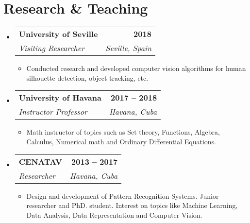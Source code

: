 \documentclass[letterpaper,11pt]{article}
\makeatletter
\newcommand{\resumeItem}[1]{
  \item\small{
    {#1 \vspace{-2pt}}
  }
}
\newcommand{\resumeSubheading}[4]{
  \vspace{-2pt}\item
    \begin{tabular*}{1.0\textwidth}[t]{l@{\extracolsep{\fill}}r}
      \textbf{#1} & \textbf{\small #2} \\
      \textit{\small#3} & \textit{\small #4} \\
    \end{tabular*}\vspace{-7pt}
}
\newcommand{\resumeProjectHeading}[2]{
    \item
    \begin{tabular*}{1.001\textwidth}{l@{\extracolsep{\fill}}r}
      \small#1 & \textbf{\small #2}\\
    \end{tabular*}\vspace{-7pt}
}
\newcommand{\resumeSubHeadingListStart}{\begin{itemize}[leftmargin=0.0in, label={}]}
\newcommand{\resumeSubHeadingListEnd}{\end{itemize}}
\newcommand{\resumeItemListStart}{\begin{itemize}}
\newcommand{\resumeItemListEnd}{\end{itemize}\vspace{-5pt}}
\makeatother
\begin{document}

\section{Research \& Teaching}
    \resumeSubHeadingListStart

      \resumeSubheading{University of Seville}{2018}{Visiting Researcher}{Seville, Spain}
          \resumeItemListStart
              \resumeItem{Conducted research and developed computer vision algorithms for human silhouette detection, object tracking, etc.}
          \resumeItemListEnd

          \resumeSubheading{University of Havana}{2017 -- 2018}{Instructor Professor}{Havana, Cuba}
          \resumeItemListStart
              \resumeItem{Math instructor of topics such as Set theory, Functions, Algebra, Calculus, Numerical math and Ordinary Differential Equations.}
          \resumeItemListEnd

          \resumeSubheading{CENATAV}{2013 -- 2017}{Researcher}{Havana, Cuba}
          \resumeItemListStart
              \resumeItem{Design and development of Pattern Recognition Systems. Junior researcher and PhD. student. Interest on topics like Machine Learning, Data Analysis, Data Representation and Computer Vision.}
          \resumeItemListEnd

    \resumeSubHeadingListEnd



\end{document}
